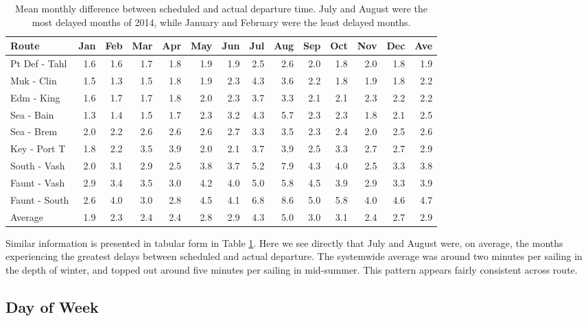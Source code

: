 \documentclass[11pt, letterpaper]{article}
\begin{document}
\begin{table}[ht]
\centering
\begin{tabular}{lrrrrrrrrrrrr | r}
  \hline
 Route & Jan & Feb & Mar & Apr & May & Jun & Jul & Aug & Sep & Oct & Nov & Dec & Ave \\ 
  \hline
 Pt Def - Tahl & 1.6 & 1.6 & 1.7 & 1.8 & 1.9 & 1.9 & 2.5 & 2.6 & 2.0 & 1.8 & 2.0 & 1.8 & 1.9 \\ 
 Muk - Clin & 1.5 & 1.3 & 1.5 & 1.8 & 1.9 & 2.3 & 4.3 & 3.6 & 2.2 & 1.8 & 1.9 & 1.8 & 2.2 \\ 
 Edm - King & 1.6 & 1.7 & 1.7 & 1.8 & 2.0 & 2.3 & 3.7 & 3.3 & 2.1 & 2.1 & 2.3 & 2.2 & 2.2 \\ 
 Sea - Bain & 1.3 & 1.4 & 1.5 & 1.7 & 2.3 & 3.2 & 4.3 & 5.7 & 2.3 & 2.3 & 1.8 & 2.1 & 2.5 \\ 
 Sea - Brem & 2.0 & 2.2 & 2.6 & 2.6 & 2.6 & 2.7 & 3.3 & 3.5 & 2.3 & 2.4 & 2.0 & 2.5 & 2.6 \\
 Key - Port T & 1.8 & 2.2 & 3.5 & 3.9 & 2.0 & 2.1 & 3.7 & 3.9 & 2.5 & 3.3 & 2.7 & 2.7 & 2.9 \\ 
  South - Vash & 2.0 & 3.1 & 2.9 & 2.5 & 3.8 & 3.7 & 5.2 & 7.9 & 4.3 & 4.0 & 2.5 & 3.3 & 3.8 \\ 
 Faunt - Vash & 2.9 & 3.4 & 3.5 & 3.0 & 4.2 & 4.0 & 5.0 & 5.8 & 4.5 & 3.9 & 2.9 & 3.3 & 3.9 \\  
  Faunt - South & 2.6 & 4.0 & 3.0 & 2.8 & 4.5 & 4.1 & 6.8 & 8.6 & 5.0 & 5.8 & 4.0 & 4.6 & 4.7 \\  
\hline
  Average & 1.9 & 2.3 & 2.4 & 2.4 & 2.8 & 2.9 & 4.3 & 5.0 & 3.0 & 3.1 & 2.4 & 2.7 & 2.9 \\ 
   \hline
\end{tabular}
\caption{Mean monthly difference between scheduled and actual departure time. July and August were the most delayed months of 2014, while January and February were the least delayed months.}
\label{monthlytable}
\end{table}

Similar information is presented in tabular form in Table \ref{monthlytable}. Here we see directly that July and August were, on average, the months experiencing the greatest delays between scheduled and actual departure. The systemwide average was around two minutes per sailing in the depth of winter, and topped out around five minutes per sailing in mid-summer. This pattern appears fairly consistent across route.

\subsection*{Day of Week}
\end{document}
